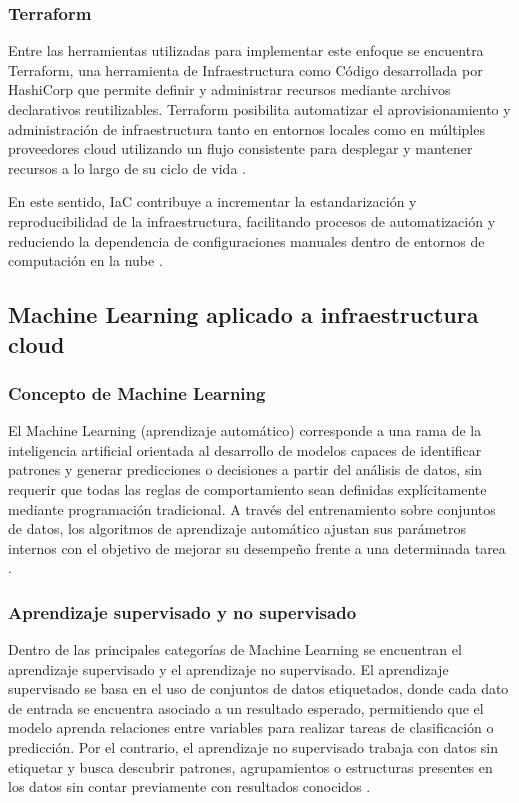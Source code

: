 \subsubsection{Terraform}

Entre las herramientas utilizadas para implementar este enfoque se encuentra Terraform, una herramienta de Infraestructura como Código desarrollada por HashiCorp que permite definir y administrar recursos mediante archivos declarativos reutilizables. Terraform posibilita automatizar el aprovisionamiento y administración de infraestructura tanto en entornos locales como en múltiples proveedores cloud utilizando un flujo consistente para desplegar y mantener recursos a lo largo de su ciclo de vida \parencite{HashiCorp2026}.

En este sentido, IaC contribuye a incrementar la estandarización y reproducibilidad de la infraestructura, facilitando procesos de automatización y reduciendo la dependencia de configuraciones manuales dentro de entornos de computación en la nube \parencite{Microsoft2025, HashiCorp2026}.

\subsection{Machine Learning aplicado a infraestructura cloud}

\subsubsection{Concepto de Machine Learning}

El Machine Learning (aprendizaje automático) corresponde a una rama de la inteligencia artificial orientada al desarrollo de modelos capaces de identificar patrones y generar predicciones o decisiones a partir del análisis de datos, sin requerir que todas las reglas de comportamiento sean definidas explícitamente mediante programación tradicional. A través del entrenamiento sobre conjuntos de datos, los algoritmos de aprendizaje automático ajustan sus parámetros internos con el objetivo de mejorar su desempeño frente a una determinada tarea \parencite{Forghani2020}.

\subsubsection{Aprendizaje supervisado y no supervisado}

Dentro de las principales categorías de Machine Learning se encuentran el aprendizaje supervisado y el aprendizaje no supervisado. El aprendizaje supervisado se basa en el uso de conjuntos de datos etiquetados, donde cada dato de entrada se encuentra asociado a un resultado esperado, permitiendo que el modelo aprenda relaciones entre variables para realizar tareas de clasificación o predicción. Por el contrario, el aprendizaje no supervisado trabaja con datos sin etiquetar y busca descubrir patrones, agrupamientos o estructuras presentes en los datos sin contar previamente con resultados conocidos \parencite{Forghani2020}.

